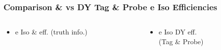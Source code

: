 \documentclass{beamer}
\begin{document}
\begin{frame}
 \frametitle{Comparison \ttbar \& \wpj vs DY Tag \& Probe e Iso Efficiencies}
   \begin{columns}

   \begin{column}{0.33\textwidth}
     \begin{itemize}
   \item e Iso \ttbar \& \wpj eff. (truth info.)
  \end{itemize}
   \end{column}
   \begin{column}{0.33\textwidth}
   \begin{itemize}
    \item e Iso DY eff. \\(Tag \& Probe)
   \end{itemize}


\end{column}
\end{columns}
\end{frame}
\end{document}
